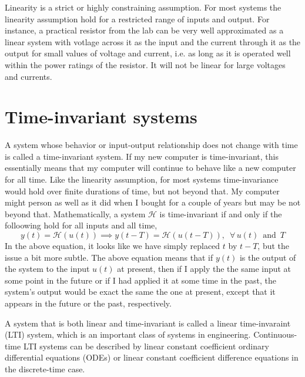 Linearity is a strict or highly constraining assumption. For most systems the linearity assumption hold for a restricted range of inputs and output. For instance, a practical resistor from the lab can be very well approximated as a linear system with votlage across it as the input and the current through it as the output for small values of voltage and current, i.e. as long as it is operated well within the power ratings of the resistor. It will not be linear for large voltages and currents. 

\section{Time-invariant systems}
A system whose behavior or input-output relationship does not change with time is called a time-invariant system. If my new computer is time-invariant, this essentially means that my computer will continue to behave like a new computer for all time. Like the linearity assumption, for most systems time-invariance would hold over finite durations of time, but not beyond that. My computer might person as well as it did when I bought for a couple of years but may be not beyond that. Mathematically, a system $\mathcal{H}$ is time-invariant if and only if the folloowing hold for all inputs and all time,
\begin{equation}
    y\left(t\right) = \mathcal{H}\left(u\left(t\right)\right) \implies y\left(t - T\right) = \mathcal{H}\left(u\left(t - T\right)\right), \,\,\, \forall \, u(t) \, \text{ and } \, T
    \label{eq:04-04-time-inv}
\end{equation}
In the above equation, it looks like we have simply replaced $t$ by $t-T$, but the issue a bit more subtle. The above equation means that if $y(t)$ is the output of the system to the input $u(t)$ at present, then if I apply the the same input at some point in the future or if I had applied it at some time in the past, the system's output would be exact the same the one at present, except that it appears in the future or the past, respectively.

A system that is both linear and time-invariant is called a linear time-invaraint (LTI) system, which is an important class of systems in engineering. Continuous-time LTI systems can be described by linear constant coefficient ordinary differential equations (ODEs) or linear constant coefficient difference equations in the discrete-time case.

